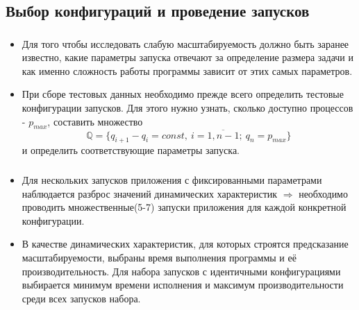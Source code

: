 \documentclass[unicode, t]{beamer}%
\begin{document}
		\subsection{Выбор конфигураций и проведение запусков}
			\begin{frame}
				\frametitle{\insertsection}
	 			\framesubtitle{\insertsubsection}
	 			\begin{itemize}[label=\(\bullet\)]
					\item Для того чтобы исследовать слабую масштабируемость должно быть заранее известно, какие параметры запуска отвечают за определение размера задачи и как именно сложность работы программы зависит от этих самых параметров.
					\item При сборе тестовых данных необходимо прежде всего определить тестовые конфигурации запусков. Для этого нужно узнать, сколько доступно процессов - \(p_{max}\), составить множество \[\mathbb{Q} = \{q_{i + 1} - q_{i} = const,\ i = \overline{1,n - 1};\ q_n = p_{max}\}\] и определить соответствующие параметры запуска.
				\end{itemize}
			\end{frame}
			\begin{frame}
				\frametitle{\insertsection}
	 			\framesubtitle{\insertsubsection}
	 			\begin{itemize}[label=\(\bullet\)]
					\item Для нескольких запусков приложения с фиксированными параметрами наблюдается разброс значений динамических характеристик \(\Rightarrow\) необходимо проводить множественные(5-7) запуски приложения для каждой конкретной конфигурации.
					\item В качестве динамических характеристик, для которых строятся предсказание масштабируемости, выбраны время выполнения программы и её производительность. Для набора запусков с идентичными конфигурациями выбирается минимум времени исполнения и максимум производительности среди всех запусков набора.
				\end{itemize}
			\end{frame}
\end{document}
